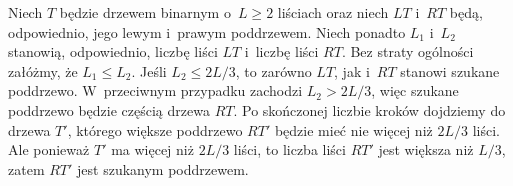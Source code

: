 \exercise %

\noindent Niech $T$ będzie drzewem binarnym o~$L\ge2$ liściach oraz niech $LT$ i~$RT$ będą, odpowiednio, jego lewym i~prawym poddrzewem.
Niech ponadto $L_1$ i~$L_2$ stanowią, odpowiednio, liczbę liści $LT$ i~liczbę liści $RT$.
Bez straty ogólności załóżmy, że $L_1\le L_2$.
Jeśli $L_2\le2L/3$, to zarówno $LT$, jak i~$RT$ stanowi szukane poddrzewo.
W~przeciwnym przypadku zachodzi $L_2>2L/3$, więc szukane poddrzewo będzie częścią drzewa $RT$.
Po skończonej liczbie kroków dojdziemy do drzewa $T'$, którego większe poddrzewo $RT'$ będzie mieć nie więcej niż $2L/3$ liści.
Ale ponieważ $T'$ ma więcej niż $2L/3$ liści, to liczba liści $RT'$ jest większa niż $L/3$, zatem $RT'$ jest szukanym poddrzewem.
